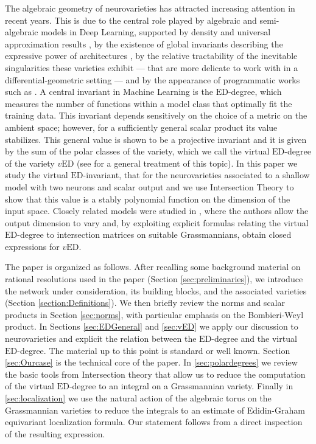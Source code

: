 \documentclass[11pt]{article}
\numberwithin{equation}{section}
\numberwithin{figure}{section}
\theoremstyle{plain}
\theoremstyle{definition}
\theoremstyle{remark}
\newcommand{\ED}{\mathrm{ED}}
\newcommand{\vED}{v\mathrm{ED}}
\begin{document}
The algebraic geometry of neurovarieties has attracted increasing attention in recent years. This is due to the central role played by algebraic and semi-algebraic models in Deep Learning, supported by density and universal approximation results \cite{SM17,SM18}, by the existence of global invariants describing the expressive power of architectures \cite{KTB19}, by the relative tractability of the inevitable singularities these varieties exhibit — that are more delicate to work with in a differential-geometric setting \cite{Wat09} — and by the appearance of programmatic works such as \cite{MSMTK25}. A central invariant in Machine Learning is the $\ED$-degree, which measures the number of functions within a model class that optimally fit the training data. This invariant depends sensitively on the choice of a metric on the ambient space; however, for a sufficiently general scalar product its value stabilizes. This general value is shown to be a projective invariant and it is given by the sum of the polar classes of the variety, which we call the virtual $\ED$-degree of the variety $\vED$ (see \cite{DHOST} for a general treatment of this topic).
In this paper we study the virtual $\ED$-invariant, that for the neurovarieties associated to a shallow model with two neurons and scalar output and we use Intersection Theory to show that this value is a stably polynomial function on the dimension of the input space.
Closely related models were studied in \cite{KLW24}, where the authors allow the output dimension to vary and, by exploiting explicit formulas relating the virtual $\ED$-degree to intersection matrices on suitable Grassmannians, obtain closed expressions for $\vED$. 

The paper is organized as follows. After recalling some background material on rational resolutions used in the paper (Section \ref{sec:preliminaries}), we introduce the network under consideration, its building blocks, and the associated varieties (Section \ref{section:Definitions}). 
We then briefly review the norms and scalar products in Section \ref{sec:norms}, with particular emphasis on the Bombieri-Weyl product. In Sections \ref{sec:EDGeneral} and \ref{sec:vED} we apply our discussion to neurovarieties and explicit the relation between the $\ED$-degree and the virtual $\ED$-degree. The material up to this point is standard or well known. Section \ref{sec:Ourcase} is the technical core of the paper. In \ref{sec:polardegrees} we review the basic tools from Intersection theory that allow us to reduce the computation of the virtual $\ED$-degree to an integral on a Grassmannian variety. Finally in \ref{sec:localization} we use the natural action of the algebraic torus on the Grassmannian varieties to reduce the integrals to an  estimate of Edidin-Graham equivariant localization formula. Our statement follows from a direct inspection of the resulting expression.
\end{document}
